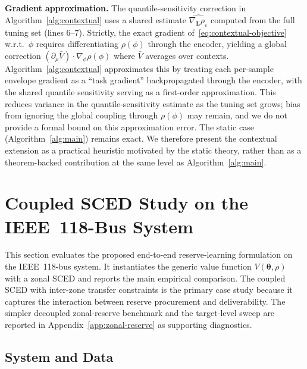 \documentclass[11pt]{article}
\newcommand{\btheta}{\bm{\theta}}
\newcommand{\bL}{\bm{L}}
\theoremstyle{definition}
\begin{document}
\textbf{Gradient approximation.} The quantile-sensitivity correction in Algorithm~\ref{alg:contextual} uses a shared estimate $\widehat{\nabla_{\bL}\rho_\varepsilon}$ computed from the full tuning set (lines 6--7). Strictly, the exact gradient of~\eqref{eq:contextual-objective} w.r.t.\ $\phi$ requires differentiating $\rho(\phi)$ through the encoder, yielding a global correction $(\partial_\rho \bar{V}) \cdot \nabla_\phi \rho(\phi)$ where $\bar{V}$ averages over contexts. Algorithm~\ref{alg:contextual} approximates this by treating each per-sample envelope gradient as a ``task gradient'' backpropagated through the encoder, with the shared quantile sensitivity serving as a first-order approximation. This reduces variance in the quantile-sensitivity estimate as the tuning set grows; bias from ignoring the global coupling through $\rho(\phi)$ may remain, and we do not provide a formal bound on this approximation error. The static case (Algorithm~\ref{alg:main}) remains exact. We therefore present the contextual extension as a practical heuristic motivated by the static theory, rather than as a theorem-backed contribution at the same level as Algorithm~\ref{alg:main}.

\section{Coupled SCED Study on the IEEE~118-Bus System}
\label{sec:application}

This section evaluates the proposed end-to-end reserve-learning formulation on the IEEE~118-bus system. It instantiates the generic value function $V(\btheta,\rho)$ with a zonal SCED and reports the main empirical comparison. The coupled SCED with inter-zone transfer constraints is the primary case study because it captures the interaction between reserve procurement and deliverability. The simpler decoupled zonal-reserve benchmark and the target-level sweep are reported in Appendix~\ref{app:zonal-reserve} as supporting diagnostics.

\subsection{System and Data}
\end{document}
